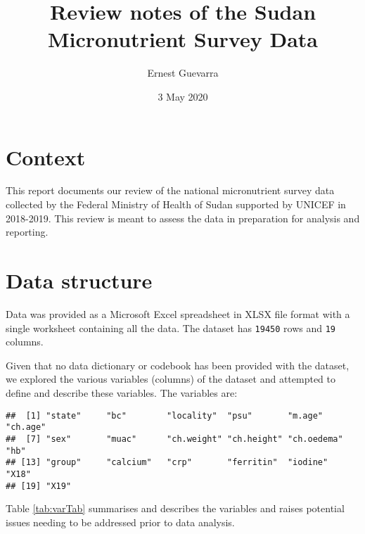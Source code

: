 \documentclass[12pt,a4paper]{article}
\title{\vspace{8cm} \LARGE{Review notes of the Sudan Micronutrient Survey Data}}
\author{Ernest Guevarra}
\date{3 May 2020}
\begin{document}
\maketitle

\newpage

\newpage

\hypertarget{context}{%
\section{Context}\label{context}}

This report documents our review of the national micronutrient survey data collected by the Federal Ministry of Health of Sudan supported by UNICEF in 2018-2019. This review is meant to assess the data in preparation for analysis and reporting.

\hypertarget{data-structure}{%
\section{Data structure}\label{data-structure}}

Data was provided as a Microsoft Excel spreadsheet in XLSX file format with a single worksheet containing all the data. The dataset has \texttt{19450} rows and \texttt{19} columns.

Given that no data dictionary or codebook has been provided with the dataset, we explored the various variables (columns) of the dataset and attempted to define and describe these variables. The variables are:

\begin{verbatim}
##  [1] "state"     "bc"        "locality"  "psu"       "m.age"     "ch.age"   
##  [7] "sex"       "muac"      "ch.weight" "ch.height" "ch.oedema" "hb"       
## [13] "group"     "calcium"   "crp"       "ferritin"  "iodine"    "X18"      
## [19] "X19"
\end{verbatim}

Table \ref{tab:varTab} summarises and describes the variables and raises potential issues needing to be addressed prior to data analysis.
\end{document}
